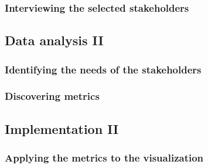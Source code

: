 \subsubsection{Interviewing the selected stakeholders}
\todo{[to be filled in]}

\subsection{Data analysis II}

\subsubsection{Identifying the needs of the stakeholders}
\todo{[to be filled in]}

\subsubsection{Discovering metrics}
\todo{[to be filled in]}

\subsection{Implementation II}

\subsubsection{Applying the metrics to the visualization}
\todo{[to be filled in]}
